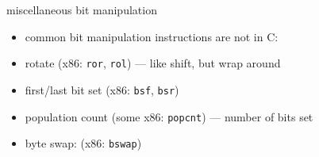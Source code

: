\begin{frame}{miscellaneous bit manipulation}
    \begin{itemize}
    \item common bit manipulation instructions are not in C:
    \vspace{.5cm}
    \item rotate (x86: {\tt ror}, {\tt rol}) --- like shift, but wrap around
    \item first/last bit set (x86: {\tt bsf}, {\tt bsr})
    \item population count (some x86: {\tt popcnt}) --- number of bits set
    \item byte swap: (x86: {\tt bswap})
    \end{itemize}
\end{frame}
